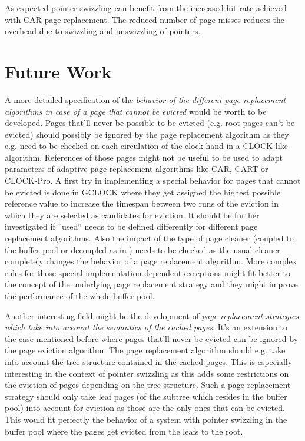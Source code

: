     As expected pointer swizzling can benefit from the increased hit rate achieved with CAR page replacement. The reduced number of page misses reduces the overhead due to swizzling and unswizzling of pointers.

\section{Future Work}

    A more detailed specification of the \emph{behavior of the different page replacement algorithms in case of a page that cannot be evicted} would be worth to be developed. Pages that'll never be possible to be evicted (e.g. root pages can't be evicted) should possibly be ignored by the page replacement algorithm as they e.g. need to be checked on each circulation of the clock hand in a CLOCK-like algorithm. References of those pages might not be useful to be used to adapt parameters of adaptive page replacement algorithms like CAR, CART or CLOCK-Pro. A first try in implementing a special behavior for pages that cannot be evicted is done in GCLOCK where they get assigned the highest possible reference value to increase the timespan between two runs of the eviction in which they are selected as candidates for eviction. It should be further investigated if ''used`` needs to be defined differently for different page replacement algorithms. Also the impact of the type of page cleaner (coupled to the buffer pool or decoupled as in \cite{Sauer:2016}) needs to be checked as the usual cleaner completely changes the behavior of a page replacement algorithm. More complex rules for those special implementation-dependent exceptions might fit better to the concept of the underlying page replacement strategy and they might improve the performance of the whole buffer pool.

    Another interesting field might be the development of \emph{page replacement strategies which take into account the semantics of the cached pages}. It's an extension to the case mentioned before where pages that'll never be evicted can be ignored by the page eviction algorithm. The page replacement algorithm should e.g. take into account the tree structure contained in the cached pages. This is especially interesting in the context of pointer swizzling as this adds some restrictions on the eviction of pages depending on the tree structure. Such a page replacement strategy should only take leaf pages (of the subtree which resides in the buffer pool) into account for eviction as those are the only ones that can be evicted. This would fit perfectly the behavior of a system with pointer swizzling in the buffer pool where the pages get evicted from the leafs to the root.
